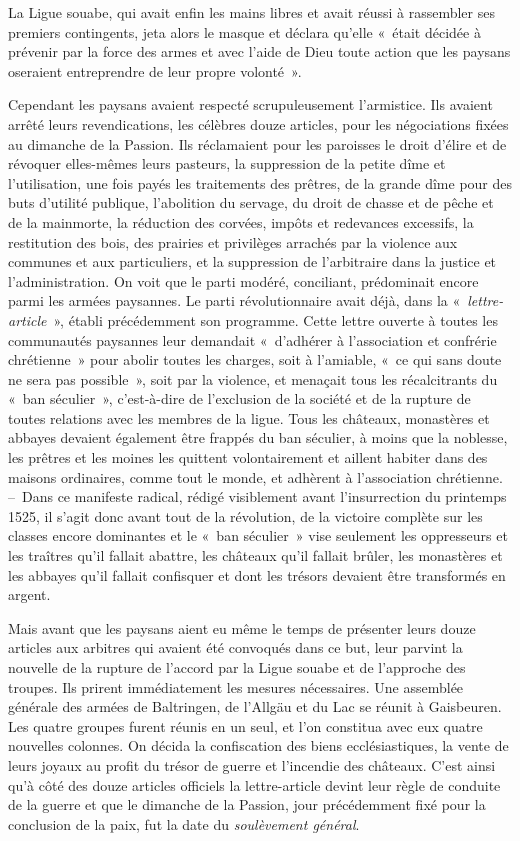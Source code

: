 \documentclass[french,twoside]{book} %
\begin{document}
La Ligue souabe, qui avait enfin les mains libres et avait réussi à rassembler ses premiers contingents, jeta alors le masque et déclara qu’elle « était décidée à prévenir par la force des armes et avec l’aide de Dieu toute action que les paysans oseraient entreprendre de leur propre volonté ».\par
Cependant les paysans avaient respecté scrupuleusement l’armistice. Ils avaient arrêté leurs revendications, les célèbres douze articles, pour les négociations fixées au dimanche de la Passion. Ils réclamaient pour les paroisses le droit d’élire et de révoquer elles-mêmes leurs pasteurs, la suppression de la petite dîme et l’utilisation, une fois payés les traitements des prêtres, de la grande dîme pour des buts d’utilité publique, l’abolition du servage, du droit de chasse et de pêche et de la mainmorte, la réduction des corvées, impôts et redevances excessifs, la restitution des bois, des prairies et privilèges arrachés par la violence aux communes et aux particuliers, et la suppression de l’arbitraire dans la justice et l’administration. On voit que le parti modéré, conciliant, prédominait encore parmi les armées paysannes. Le parti révolutionnaire avait déjà, dans la « \emph{lettre-article} », établi précédemment son programme. Cette lettre ouverte à toutes les communautés paysannes leur demandait « d’adhérer à l’association et confrérie chrétienne » pour abolir toutes les charges, soit à l’amiable, « ce qui sans doute ne sera pas possible », soit par la violence, et menaçait tous les récalcitrants du « ban séculier », c’est-à-dire de l’exclusion de la société et de la rupture de toutes relations avec les membres de la ligue. Tous les châteaux, monastères et abbayes devaient également être frappés du ban séculier, à moins que la noblesse, les prêtres et les moines les quittent volontairement et aillent habiter dans des maisons ordinaires, comme tout le monde, et adhèrent à l’association chrétienne. – Dans ce manifeste radical, rédigé visiblement avant l’insurrection du printemps 1525, il s’agit donc avant tout de la révolution, de la victoire complète sur les classes encore dominantes et le « ban séculier » vise seulement les oppresseurs et les traîtres qu’il fallait abattre, les châteaux qu’il fallait brûler, les monastères et les abbayes qu’il fallait confisquer et dont les trésors devaient être transformés en argent.\par
Mais avant que les paysans aient eu même le temps de présenter leurs douze articles aux arbitres qui avaient été convoqués dans ce but, leur parvint la nouvelle de la rupture de l’accord par la Ligue souabe et de l’approche des troupes. Ils prirent immédiatement les mesures nécessaires. Une assemblée générale des armées de Baltringen, de l’Allgäu et du Lac se réunit à Gaisbeuren. Les quatre groupes furent réunis en un seul, et l’on constitua avec eux quatre nouvelles colonnes. On décida la confiscation des biens ecclésiastiques, la vente de leurs joyaux au profit du trésor de guerre et l’incendie des châteaux. C’est ainsi qu’à côté des douze articles officiels la lettre-article devint leur règle de conduite de la guerre et que le dimanche de la Passion, jour précédemment fixé pour la conclusion de la paix, fut la date du \emph{soulèvement général}.\par
\end{document}
